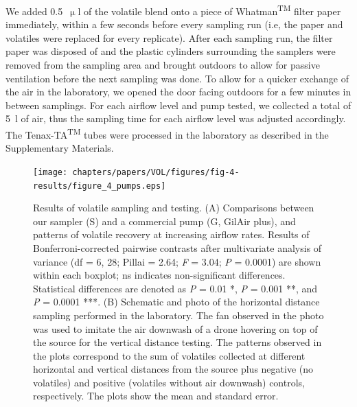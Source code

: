 We added 0.5~$\upmu$l of the volatile blend onto a piece of Whatman\textsuperscript{TM} filter paper immediately, within a few seconds before every sampling run (i.e, the paper and volatiles were replaced for every replicate). After each sampling run, the filter paper was disposed of and the plastic cylinders surrounding the samplers were removed from the sampling area and brought outdoors to allow for passive ventilation before the next sampling was done. To allow for a quicker exchange of the air in the laboratory, we opened the door facing outdoors for a few minutes in between samplings. For each airflow level and pump tested, we collected a total of 5~l of air, thus the sampling time for each airflow level was adjusted accordingly. The Tenax-TA\textsuperscript{TM} tubes were processed in the laboratory as described in the Supplementary Materials. 
 

\begin{figure}[!t]
\centering
\texttt{[image: chapters/papers/VOL/figures/fig-4-results/figure\_4\_pumps.eps]}
\caption{Results of volatile sampling and testing. (A) Comparisons between our sampler (S) and a commercial pump (G, GilAir plus), and patterns of volatile recovery at increasing airflow rates. Results of Bonferroni-corrected pairwise contrasts after multivariate analysis of variance (df = 6, 28; Pillai = 2.64; \textit{F} = 3.04; \textit{P} = 0.0001) are shown within each boxplot; ns indicates non-significant differences. Statistical differences are denoted as \textit{P} = 0.01 *, \textit{P} = 0.001 **, and \textit{P} = 0.0001 ***. (B) Schematic and photo of the horizontal distance sampling performed in the laboratory. The fan observed in the photo was used to imitate the air downwash of a drone hovering on top of the source for the vertical distance testing. The patterns observed in the plots correspond to the sum of volatiles collected at different horizontal and vertical distances from the source plus negative (no volatiles) and positive (volatiles without air downwash) controls, respectively. The plots show the mean and standard error.}
\label{Flowrate_results}
\end{figure}



